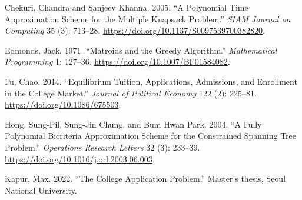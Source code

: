 \documentclass[11pt]{article} %
\theoremstyle{definition}
\begin{document}
Chekuri, Chandra and Sanjeev Khanna. 2005. ``A Polynomial Time Approximation Scheme for the Multiple Knapsack Problem.'' \emph{SIAM Journal on Computing} 35 (3): 713--28. \url{https://doi.org/10.1137/S0097539700382820}.

%
%
%
Edmonds, Jack. 1971. ``Matroids and the Greedy Algorithm.'' \emph{Mathematical Programming} 1: 127--36. \url{https://doi.org/10.1007/BF01584082}.  

%
Fu, Chao. 2014. ``Equilibrium Tuition, Applications, Admissions, and Enrollment in the College Market.'' \emph{Journal of Political Economy} 122 (2): 225--81. \url{https://doi.org/10.1086/675503}. 

%
%
%
Hong, Sung-Pil, Sung-Jin Chung, and Bum Hwan Park. 2004. ``A Fully Polynomial Bicriteria Approximation Scheme for the Constrained Spanning Tree Problem.'' \emph{Operations Research Letters} 32 (3): 233--39. \url{https://doi.org/10.1016/j.orl.2003.06.003}.

%
%
%
Kapur, Max. 2022. ``The College Application Problem.'' Master's thesis, Seoul National University. 
\end{document}
